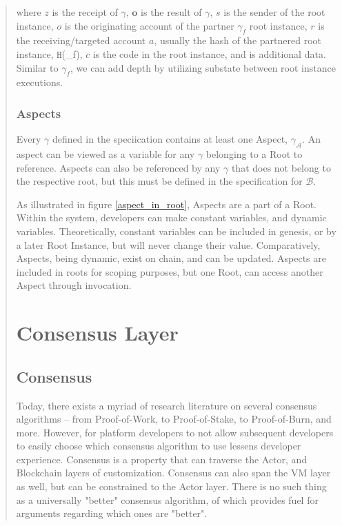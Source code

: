\documentclass[12pt, titlepage, twocolumn]{report}
\begin{document}
\begin{quotation}
where \(z\) is the receipt of \(\gamma\), \(\mathbf{o}\) is the result of \(\gamma\), \(s\) is the sender of the root instance, \(o\) is the originating account of the partner \(\gamma_f\) root instance, \(r\) is the receiving/targeted account \(a\), usually the hash of the partnered root instance, \(\boldsymbol{\texttt{H}}\)(\gamma_f)\), \(c\) is the code in the root instance, and  is additional data. Similar to \(\gamma_f\), we can add depth by utilizing substate between root instance executions.


\subsection{Aspects}
Every \(\gamma\) defined in the speciication contains at least one Aspect, \(\gamma_{\boldsymbol{\mathcal{A}}}\). An aspect can be viewed as a variable for any \(\gamma\) belonging to a Root to reference. Aspects can also be referenced by any \(\gamma\) that does not belong to the respective root, but this must be defined in the specification for \( \boldsymbol{\mathcal{B}} \). 

As illustrated in figure \ref{aspect_in_root}, Aspects are a part of a Root. Within the system, developers can make constant variables, and dynamic variables. Theoretically, constant variables can be included in genesis, or by a later Root Instance, but will never change their value. Comparatively, Aspects, being dynamic, exist on chain, and can be updated. Aspects are included in roots for scoping purposes, but one Root, can access another Aspect through invocation. 

\chapter{Consensus Layer}


\section{Consensus}
Today, there exists a myriad of research literature on several consensus algorithms -- from Proof-of-Work, to Proof-of-Stake, to Proof-of-Burn, and more. However, for platform developers to not allow subsequent developers to easily choose which consensus algorithm to use lessens developer experience. Consensus is a property that can traverse the Actor, and Blockchain layers of customization. Consensus can also span the VM layer as well, but can be constrained to the Actor layer. There is no such thing as a universally "better" consensus algorithm, of which provides fuel for arguments regarding which ones are "better". 



\end{quotation}
\end{document}
